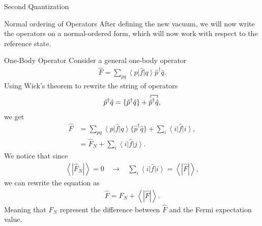 \documentclass[twoside,english]{uiofysmaster}
\begin{document}
\begin{chapter}{Second Quantization}
	\begin{section}{Normal ordering of Operators}
		After defining the new vacuum, we will now write the operators on a normal-ordered form, which will now work with respect to the reference state.	
		\begin{subsection}{One-Body Operator}
			 Consider a general one-body operator
			\begin{align}
				\hat F = \sum_{pq} \left< p \right| \hat f \left| q \right> \hat p^\dagger \hat q.
			\end{align}
			Using Wick's theorem to rewrite the string of operators
			\begin{align}
				\hat p^\dagger \hat q = \{\hat p^\dagger \hat q \} + \contraction{}{\hat p}{^\dagger}{\hat q}
				\hat p^\dagger \hat q,
			\end{align}
			we get 	
			\begin{align}
				\hat F &= \sum_{pq} \left< p \right| \hat f \left| q \right> \{ \hat p^\dagger \hat q \} + \sum_i \left< i \right| \hat f \left| i \right>,\\
					&= \hat F_N + \sum_i \left< i \right| \hat f \left| j \right>.
			\end{align}
			We notice that since 
			\begin{align}
				\left< \right. | \hat F_N |\left. \right> = 0 \:\:\:\: \rightarrow \:\:\:\: \sum_i \left< i \right| \hat f \left| i \right> = \left< \right. | \hat F | \left. \right>,
			\end{align}
			we can rewrite the equation as
			\begin{align}
				\hat F = F_N + \left< \right. | \hat F | \left. \right>.
			\end{align}
			Meaning that $F_N$ represent the difference between $\hat F$ and the Fermi expectation value. 
		\end{subsection}
		

\end{section}
\end{chapter}
\end{document}

